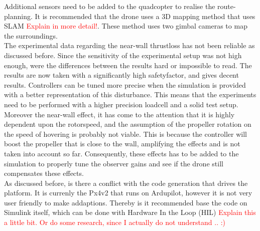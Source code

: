 Additional sensors need to be added to the quadcopter to realise the route-planning. It is recommended that the drone uses a 3D mapping method that uses SLAM \textcolor{red}{Explain in more detail!}. These method uses two gimbal cameras to map the surroundings.\\
The experimental data regarding the near-wall thrustloss has not been reliable as discussed before. Since the sensitivity of the experimental setup was not high enough, were the differences between the results hard or impossible to read. The results are now taken with a significantly high safetyfactor, and gives decent results. Controllers can be tuned more precise when the simulation is provided with a better representation of this disturbance. This means that the experiments need to be performed with a higher precision loadcell and a solid test setup.\\
Moreover the near-wall effect, it has come to the attention that it is highly dependent upon the rotorspeed, and the assumption of the propeller rotation on the speed of hovering is probably not viable. This is because the controller will boost the propeller that is close to the wall, amplifying the effects and is not taken into account so far. Consequently, these effects has to be added to the simulation to properly tune the observer gains and see if the drone still compensates these effects.\\
As discussed before, is there a conflict with the code generation that drives the platform. It is currenly the Px4v2 that runs on Ardupilot, however it is not very user friendly to make addaptions. Thereby is it recommended base the code on Simulink itself, which can be done with Hardware In the Loop (HIL) \textcolor{red}{Explain this a little bit. Or do some research, since I actually do not understand .. :)}\\




